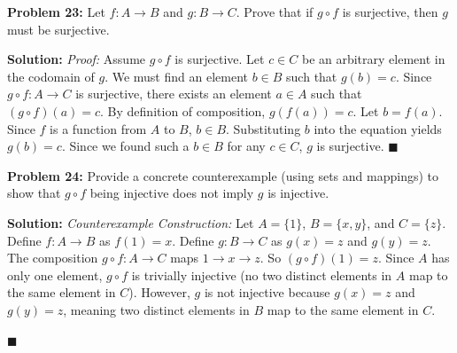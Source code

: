 \documentclass[11pt, letterpaper]{article}
\theoremstyle{definition}
\theoremstyle{remark}
\begin{document}
\vspace{1em}
\textbf{Problem 23:} Let $f: A \to B$ and $g: B \to C$. Prove that if $g \circ f$ is surjective, then $g$ must be surjective.

\textbf{Solution:}
\textit{Proof:} Assume $g \circ f$ is surjective. Let $c \in C$ be an arbitrary element in the codomain of $g$. We must find an element $b \in B$ such that $g(b) = c$.
Since $g \circ f: A \to C$ is surjective, there exists an element $a \in A$ such that $(g \circ f)(a) = c$.
By definition of composition, $g(f(a)) = c$.
Let $b = f(a)$. Since $f$ is a function from $A$ to $B$, $b \in B$.
Substituting $b$ into the equation yields $g(b) = c$. Since we found such a $b \in B$ for any $c \in C$, $g$ is surjective. \hfill $\blacksquare$

\vspace{1em}
\textbf{Problem 24:} Provide a concrete counterexample (using sets and mappings) to show that $g \circ f$ being injective does not imply $g$ is injective.

\textbf{Solution:}
\textit{Counterexample Construction:}
Let $A = \{1\}$, $B = \{x, y\}$, and $C = \{z\}$.
Define $f: A \to B$ as $f(1) = x$.
Define $g: B \to C$ as $g(x) = z$ and $g(y) = z$.
The composition $g \circ f: A \to C$ maps $1 \to x \to z$. So $(g \circ f)(1) = z$.
Since $A$ has only one element, $g \circ f$ is trivially injective (no two distinct elements in $A$ map to the same element in $C$).
However, $g$ is not injective because $g(x) = z$ and $g(y) = z$, meaning two distinct elements in $B$ map to the same element in $C$.

\begin{center}
\end{center}
\hfill $\blacksquare$
\end{document}
